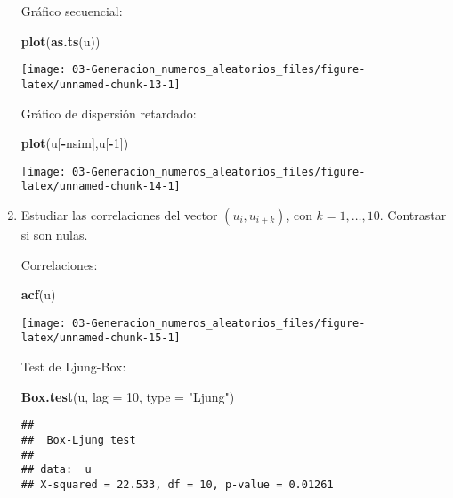 \documentclass[
]{book}
\newenvironment{Shaded}{\begin{snugshade}}{\end{snugshade}}
\newcommand{\DataTypeTok}[1]{\textcolor[rgb]{0.13,0.29,0.53}{#1}}
\newcommand{\DecValTok}[1]{\textcolor[rgb]{0.00,0.00,0.81}{#1}}
\newcommand{\KeywordTok}[1]{\textcolor[rgb]{0.13,0.29,0.53}{\textbf{#1}}}
\newcommand{\NormalTok}[1]{#1}
\newcommand{\OperatorTok}[1]{\textcolor[rgb]{0.81,0.36,0.00}{\textbf{#1}}}
\newcommand{\StringTok}[1]{\textcolor[rgb]{0.31,0.60,0.02}{#1}}
\theoremstyle{break}
\theoremstyle{definition}
\theoremstyle{definition}
\theoremstyle{definition}
\theoremstyle{remark}
\begin{document}
\begin{enumerate}
  Gráfico secuencial:

\begin{Shaded}
\begin{Highlighting}[]
\KeywordTok{plot}\NormalTok{(}\KeywordTok{as.ts}\NormalTok{(u))}
\end{Highlighting}
\end{Shaded}

  \begin{center}\texttt{[image: 03-Generacion\_numeros\_aleatorios\_files/figure-latex/unnamed-chunk-13-1]} \end{center}

  Gráfico de dispersión retardado:

\begin{Shaded}
\begin{Highlighting}[]
\KeywordTok{plot}\NormalTok{(u[}\OperatorTok{-}\NormalTok{nsim],u[}\OperatorTok{-}\DecValTok{1}\NormalTok{])}
\end{Highlighting}
\end{Shaded}

  \begin{center}\texttt{[image: 03-Generacion\_numeros\_aleatorios\_files/figure-latex/unnamed-chunk-14-1]} \end{center}
\item
  Estudiar las correlaciones del vector \((u_{i},u_{i+k})\), con
  \(k=1,\ldots,10\). Contrastar si son nulas.

  Correlaciones:

\begin{Shaded}
\begin{Highlighting}[]
\KeywordTok{acf}\NormalTok{(u)}
\end{Highlighting}
\end{Shaded}

  \begin{center}\texttt{[image: 03-Generacion\_numeros\_aleatorios\_files/figure-latex/unnamed-chunk-15-1]} \end{center}

  Test de Ljung-Box:

\begin{Shaded}
\begin{Highlighting}[]
\KeywordTok{Box.test}\NormalTok{(u, }\DataTypeTok{lag =} \DecValTok{10}\NormalTok{, }\DataTypeTok{type =} \StringTok{"Ljung"}\NormalTok{)}
\end{Highlighting}
\end{Shaded}

\begin{verbatim}
## 
##  Box-Ljung test
## 
## data:  u
## X-squared = 22.533, df = 10, p-value = 0.01261
\end{verbatim}
\end{enumerate}
\end{document}
